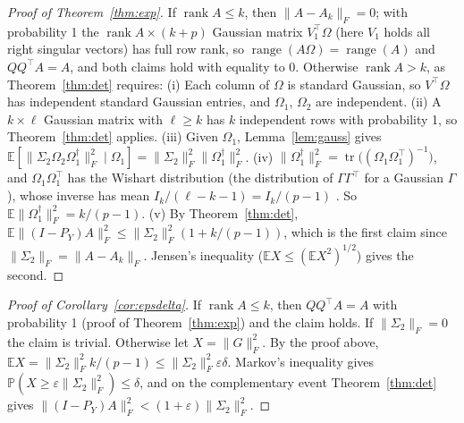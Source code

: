 \documentclass[10pt]{article}
\theoremstyle{plain}
\theoremstyle{definition}
\theoremstyle{remark}
\newcommand{\E}{\mathbb{E}}
\newcommand{\Prob}{\mathbb{P}}
\newcommand{\T}{^{\top}}
\newcommand{\fro}[1]{\lVert #1\rVert_F}
\DeclareMathOperator{\tr}{tr}
\DeclareMathOperator{\rank}{rank}
\DeclareMathOperator{\range}{range}
\begin{document}
\begin{proof}[Proof of Theorem~\ref{thm:exp}]
If $\rank A\le k$, then $\fro{A-A_k}=0$; with probability 1 the $\rank A\times(k+p)$ Gaussian matrix $V_1\T\Omega$ (here $V_1$ holds all right singular vectors) has full row rank, so $\range(A\Omega)=\range(A)$ and $QQ\T A=A$, and both claims hold with equality to $0$. Otherwise $\rank A>k$, as Theorem~\ref{thm:det} requires:
(i) Each column of $\Omega$ is standard Gaussian, so $V\T\Omega$ has independent standard Gaussian entries, and $\Omega_1$, $\Omega_2$ are independent.
(ii) A $k\times\ell$ Gaussian matrix with $\ell\ge k$ has $k$ independent rows with probability 1, so Theorem~\ref{thm:det} applies.
(iii) Given $\Omega_1$, Lemma~\ref{lem:gauss} gives $\E[\fro{\Sigma_2\Omega_2\Omega_1^\dagger}^2\mid\Omega_1]=\fro{\Sigma_2}^2\fro{\Omega_1^\dagger}^2$.
(iv) $\fro{\Omega_1^\dagger}^2=\tr\bigl((\Omega_1\Omega_1\T)^{-1}\bigr)$, and $\Omega_1\Omega_1\T$ has the Wishart distribution (the distribution of $\Gamma\Gamma\T$ for a Gaussian $\Gamma$), whose inverse has mean $I_k/(\ell-k-1)=I_k/(p-1)$ \cite{muirhead1982}. So $\E\fro{\Omega_1^\dagger}^2=k/(p-1)$.
(v) By Theorem~\ref{thm:det}, $\E\fro{(I-P_Y)A}^2\le\fro{\Sigma_2}^2(1+k/(p-1))$, which is the first claim since $\fro{\Sigma_2}=\fro{A-A_k}$. Jensen's inequality ($\E X\le(\E X^2)^{1/2}$) gives the second.
\end{proof}

\begin{proof}[Proof of Corollary~\ref{cor:epsdelta}]
If $\rank A\le k$, then $QQ\T A=A$ with probability 1 (proof of Theorem~\ref{thm:exp}) and the claim holds. If $\fro{\Sigma_2}=0$ the claim is trivial. Otherwise let $X=\fro G^2$. By the proof above, $\E X=\fro{\Sigma_2}^2k/(p-1)\le\fro{\Sigma_2}^2\varepsilon\delta$. Markov's inequality gives $\Prob(X\ge\varepsilon\fro{\Sigma_2}^2)\le\delta$, and on the complementary event Theorem~\ref{thm:det} gives $\fro{(I-P_Y)A}^2<(1+\varepsilon)\fro{\Sigma_2}^2$.
\end{proof}
\end{document}
